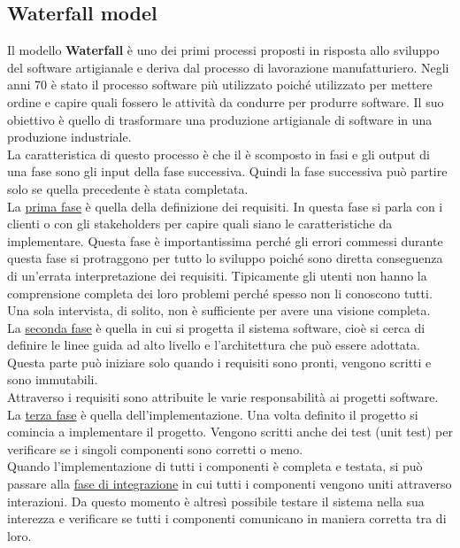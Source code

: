 \subsection{Waterfall model}
Il modello \textbf{Waterfall} è uno dei primi processi proposti in risposta allo sviluppo del software artigianale e deriva dal processo di lavorazione manufatturiero.
Negli anni 70 è stato il processo software più utilizzato poiché utilizzato per mettere ordine e capire quali fossero le attività da condurre per produrre software.
Il suo obiettivo è quello di trasformare una produzione artigianale di software in una produzione industriale.\\
La caratteristica di questo processo è che il è scomposto in fasi e gli output di una fase sono gli input della fase successiva.
Quindi la fase successiva può partire solo se quella precedente è stata completata.\\
La \underline{prima fase} è quella della definizione dei requisiti.
In questa fase si parla con i clienti o con gli stakeholders per capire quali siano le caratteristiche da implementare.
Questa fase è importantissima perché gli errori commessi durante questa fase si protraggono per tutto lo sviluppo poiché sono diretta conseguenza di un'errata interpretazione dei requisiti.
Tipicamente gli utenti non hanno la comprensione completa dei loro problemi perché spesso non li conoscono tutti.
Una sola intervista, di solito, non è sufficiente per avere una visione completa.\\
La \underline{seconda fase} è quella in cui si progetta il sistema software, cioè si cerca di definire le linee guida ad alto livello e l'architettura che può essere adottata.
Questa parte può iniziare solo quando i requisiti sono pronti, vengono scritti e sono immutabili.\\
Attraverso i requisiti sono attribuite le varie responsabilità ai progetti software.\\
La \underline{terza fase} è quella dell'implementazione.
Una volta definito il progetto si comincia a implementare il progetto.
Vengono scritti anche dei test (unit test) per verificare se i singoli componenti sono corretti o meno.\\
Quando l'implementazione di tutti i componenti è completa e testata, si può passare alla \underline{fase di integrazione} in cui tutti i componenti vengono uniti attraverso interazioni.
Da questo momento è altresì possibile testare il  sistema nella sua interezza e verificare se tutti i componenti comunicano in maniera corretta tra di loro.

